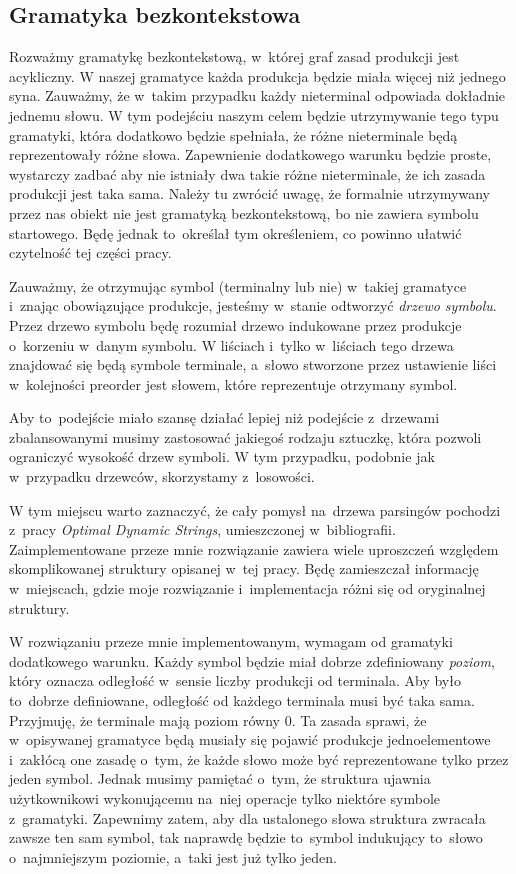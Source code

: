 \documentclass[declaration,shortabstract]{iithesis}
\theoremstyle{definition} \newtheorem{definition}{Definicja}[chapter]
\theoremstyle{remark} \newtheorem{remark}[definition]{Obserwacja}
\theoremstyle{plain} \newtheorem{theorem}[definition]{Twierdzenie}
\theoremstyle{remark} \newtheorem{example}{Przykład}[definition]
\theoremstyle{plain} \newtheorem{lemma}[definition]{Lemat}
\begin{document}
\subsection{Gramatyka bezkontekstowa}

Rozważmy gramatykę bezkontekstową, w~której graf zasad produkcji jest acykliczny. W naszej gramatyce każda produkcja będzie miała więcej niż jednego syna. Zauważmy, że w~takim przypadku każdy nieterminal odpowiada dokładnie jednemu słowu. W tym podejściu naszym celem będzie utrzymywanie tego typu gramatyki, która dodatkowo będzie spełniała, że różne nieterminale będą reprezentowały różne słowa. Zapewnienie dodatkowego warunku będzie proste, wystarczy zadbać aby nie istniały dwa takie różne nieterminale, że ich zasada produkcji jest taka sama. Należy tu zwrócić uwagę, że formalnie utrzymywany przez nas obiekt nie jest gramatyką bezkontekstową, bo nie zawiera symbolu startowego. Będę jednak to~określał tym określeniem, co powinno ułatwić czytelność tej części pracy.

Zauważmy, że otrzymując symbol (terminalny lub nie) w~takiej gramatyce i~znając obowiązujące produkcje, jesteśmy w~stanie odtworzyć \textit{drzewo symbolu}. Przez drzewo symbolu będę rozumiał drzewo indukowane przez produkcje o~korzeniu w~danym symbolu. W liściach i~tylko w~liściach tego drzewa znajdować się będą symbole terminale, a~słowo stworzone przez ustawienie liści w~kolejności preorder jest słowem, które reprezentuje otrzymany symbol.

Aby to~podejście miało szansę działać lepiej niż podejście z~drzewami zbalansowanymi musimy zastosować jakiegoś rodzaju sztuczkę, która pozwoli ograniczyć wysokość drzew symboli. W tym przypadku, podobnie jak w~przypadku drzewców, skorzystamy z~losowości.

W tym miejscu warto zaznaczyć, że cały pomysł na~drzewa parsingów pochodzi z~pracy \textit{Optimal Dynamic Strings}, umieszczonej w~bibliografii. Zaimplementowane przeze mnie rozwiązanie zawiera wiele uproszczeń względem skomplikowanej struktury opisanej w~tej pracy. Będę zamieszczał informację w~miejscach, gdzie moje rozwiązanie i~implementacja różni się od oryginalnej struktury.

W rozwiązaniu przeze mnie implementowanym, wymagam od gramatyki dodatkowego warunku. Każdy symbol będzie miał dobrze zdefiniowany \textit{poziom}, który oznacza odległość w~sensie liczby produkcji od terminala. Aby było to~dobrze definiowane, odległość od każdego terminala musi być taka sama. Przyjmuję, że terminale mają poziom równy $0$. Ta zasada sprawi, że w~opisywanej gramatyce będą musiały się pojawić produkcje jednoelementowe i~zakłócą one zasadę o~tym, że każde słowo może być reprezentowane tylko przez jeden symbol. Jednak musimy pamiętać o~tym, że struktura ujawnia użytkownikowi wykonującemu na~niej operacje tylko niektóre symbole z~gramatyki. Zapewnimy zatem, aby dla ustalonego słowa struktura zwracała zawsze ten sam symbol, tak naprawdę będzie to~symbol indukujący to~słowo o~najmniejszym poziomie, a~taki jest już tylko jeden.
\end{document}
